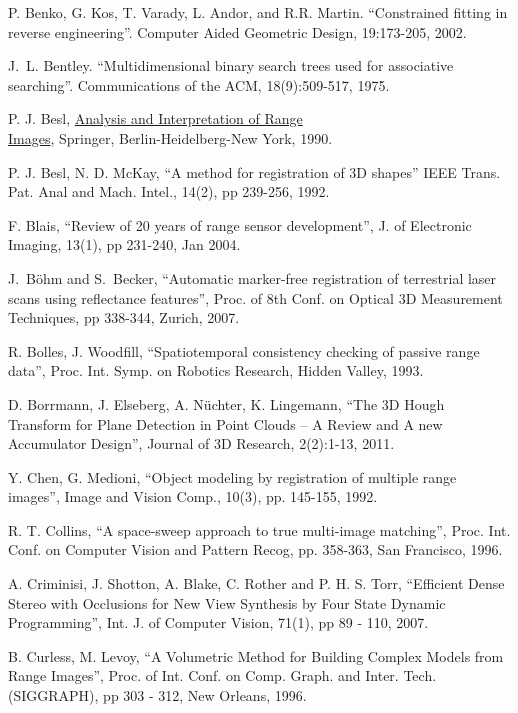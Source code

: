 \documentclass[twocolumn,oneside]{book}
\begin{document}
\begin{thebibliography}{99}
P. Benko, G. Kos, T. Varady, L. Andor, and R.R. Martin.
``Constrained fitting in reverse engineering''. 
Computer Aided Geometric Design, 19:173-205, 2002.

J.~L. Bentley.
``Multidimensional binary search trees used for associative searching''.
Communications of the ACM, 18(9):509-517, 1975.

P. J. Besl,
{\underline{Analysis and Interpretation of Range}}\\{\underline {Images}},
Springer, Berlin-Heidelberg-New York, 1990.

P. J. Besl, N. D. McKay,
``A method for registration of 3D shapes''
IEEE Trans. Pat. Anal and Mach. Intel., 14(2), pp 239-256, 1992.

F. Blais,
``Review of 20 years of range sensor development'',
J. of Electronic Imaging, 13(1), pp 231-240, Jan 2004.

J.~B{\"o}hm and S.~Becker,
``Automatic marker-free registration of terrestrial laser scans using reflectance features'',
Proc. of 8th Conf. on Optical 3D Measurement
  Techniques, pp 338-344, Zurich, 2007.

R. Bolles, J. Woodfill, 
``Spatiotemporal consistency checking of passive range data'',  
Proc. Int. Symp. on Robotics Research, Hidden Valley, 1993.

D. Borrmann, J. Elseberg, A. N{\"u}chter, K. Lingemann,
``The 3D Hough Transform for Plane Detection in Point Clouds -- A Review and A new Accumulator Design'',
Journal of 3D Research, 2(2):1-13, 2011.

Y. Chen, G. Medioni,
``Object modeling by registration of multiple range images'',
Image and Vision Comp., 10(3), pp. 145-155, 1992.

R. T. Collins,
``A space-sweep approach to true multi-image matching'', 
Proc. Int. Conf. on Computer Vision and Pattern Recog, pp. 358-363, San Francisco, 1996.

A.  Criminisi, J. Shotton, A. Blake, C. Rother and P. H. S. Torr,
``Efficient Dense Stereo with Occlusions for New View Synthesis by Four State Dynamic Programming'', 
Int. J. of Computer Vision, 71(1), pp 89 - 110, 2007.

B. Curless, M. Levoy,
``A Volumetric Method for Building Complex Models from Range Images'',
Proc.  of Int. Conf. on Comp. Graph. and Inter. Tech. (SIGGRAPH), pp 303 - 312, New Orleans, 1996.


\end{thebibliography}
\end{document}
